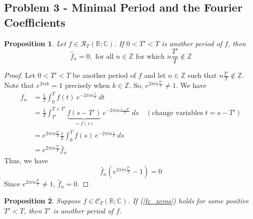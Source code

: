 \documentclass[12pt, reqno]{article}
\newtheorem{prop}{Proposition}[section]
\theoremstyle{definition}
\theoremstyle{remark}
\begin{document}
\vspace{0.2 cm}
\subsection*{Problem 3 - Minimal Period and the Fourier Coefficients} 



\begin{prop}
    Let $f\in\mathcal{R}_T(\mathbb{R;C})$. If $0<T'<T$ is another period of $f$, then 
    \begin{equation} \label{fc_zeros}
        \hat{f}_n=0,\text{ for all }n\in\mathbb{Z}\text{ for which }n\frac{T'}{T}\notin\mathbb{Z}
    \end{equation}
\end{prop}

\begin{proof}
    Let $0<T'<T$ be another period of $f$ and let $n\in\mathbb{Z}$ such that $n\frac{T'}{T}\notin\mathbb{Z}$. Note that $e^{2\pi ik}=1$ precisely when $k\in\mathbb{Z}$. So, $e^{2\pi in \frac{T'}{T}}\ne1$. We have 
    \begin{align*}
        \hat f_{n}&= \frac{1}{T}\int_{0}^{T}f(t)\ e^{-2\pi in \frac{t}{T}}\ dt\\
        &= \frac{1}{T}\int_{T'}^{T+T'}\underbrace{f(s-T')}_{=f(s)}\ e^{-2\pi in \frac{s-T'}{T}}\ ds\quad(\text{change variables }t=s-T')\\
        &= e^{2\pi in \frac{T'}{T}} \frac{1}{T}\int_{0}^{T}f(s)\ e^{-2\pi in \frac{s}{T}}\ ds\\
        &= e^{2\pi in \frac{T'}{T}}\hat f_{n}
    \end{align*}
    Thus, we have 
    \[
        \hat f_{n}(e^{2\pi in \frac{T'}{T}}-1)=0
    \]
    Since $e^{2\pi in \frac{T'}{T}}\ne1$, $\hat f_{n}=0$. 
\end{proof}

\begin{prop}
    Suppose $f\in\mathcal{C}_T(\mathbb{R;C})$. If (\ref{fc_zeros}) holds for some positive $T'<T$, then $T'$ is another period of $f$.
\end{prop}
\end{document}
